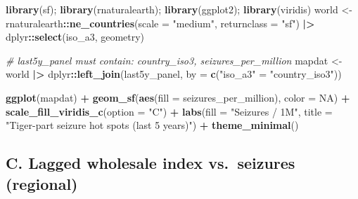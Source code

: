 \documentclass[
]{article}
\newenvironment{Shaded}{\begin{snugshade}}{\end{snugshade}}
\newcommand{\AttributeTok}[1]{\textcolor[rgb]{0.13,0.29,0.53}{#1}}
\newcommand{\CommentTok}[1]{\textcolor[rgb]{0.56,0.35,0.01}{\textit{#1}}}
\newcommand{\ConstantTok}[1]{\textcolor[rgb]{0.56,0.35,0.01}{#1}}
\newcommand{\FunctionTok}[1]{\textcolor[rgb]{0.13,0.29,0.53}{\textbf{#1}}}
\newcommand{\NormalTok}[1]{#1}
\newcommand{\OtherTok}[1]{\textcolor[rgb]{0.56,0.35,0.01}{#1}}
\newcommand{\SpecialCharTok}[1]{\textcolor[rgb]{0.81,0.36,0.00}{\textbf{#1}}}
\newcommand{\StringTok}[1]{\textcolor[rgb]{0.31,0.60,0.02}{#1}}
\begin{document}
\begin{Shaded}
\begin{Highlighting}[]
\FunctionTok{library}\NormalTok{(sf); }\FunctionTok{library}\NormalTok{(rnaturalearth); }\FunctionTok{library}\NormalTok{(ggplot2); }\FunctionTok{library}\NormalTok{(viridis)}
\NormalTok{world }\OtherTok{\textless{}{-}}\NormalTok{ rnaturalearth}\SpecialCharTok{::}\FunctionTok{ne\_countries}\NormalTok{(}\AttributeTok{scale =} \StringTok{"medium"}\NormalTok{, }\AttributeTok{returnclass =} \StringTok{"sf"}\NormalTok{) }\SpecialCharTok{|\textgreater{}}
\NormalTok{  dplyr}\SpecialCharTok{::}\FunctionTok{select}\NormalTok{(iso\_a3, geometry)}

\CommentTok{\# last5y\_panel must contain: country\_iso3, seizures\_per\_million}
\NormalTok{mapdat }\OtherTok{\textless{}{-}}\NormalTok{ world }\SpecialCharTok{|\textgreater{}}\NormalTok{ dplyr}\SpecialCharTok{::}\FunctionTok{left\_join}\NormalTok{(last5y\_panel, }\AttributeTok{by =} \FunctionTok{c}\NormalTok{(}\StringTok{"iso\_a3"} \OtherTok{=} \StringTok{"country\_iso3"}\NormalTok{))}

\FunctionTok{ggplot}\NormalTok{(mapdat) }\SpecialCharTok{+}
  \FunctionTok{geom\_sf}\NormalTok{(}\FunctionTok{aes}\NormalTok{(}\AttributeTok{fill =}\NormalTok{ seizures\_per\_million), }\AttributeTok{color =} \ConstantTok{NA}\NormalTok{) }\SpecialCharTok{+}
  \FunctionTok{scale\_fill\_viridis\_c}\NormalTok{(}\AttributeTok{option =} \StringTok{"C"}\NormalTok{) }\SpecialCharTok{+}
  \FunctionTok{labs}\NormalTok{(}\AttributeTok{fill =} \StringTok{"Seizures / 1M"}\NormalTok{, }\AttributeTok{title =} \StringTok{"Tiger{-}part seizure hot spots (last 5 years)"}\NormalTok{) }\SpecialCharTok{+}
  \FunctionTok{theme\_minimal}\NormalTok{()}
\end{Highlighting}
\end{Shaded}

\subsection{C. Lagged wholesale index vs.~seizures
(regional)}\label{c.-lagged-wholesale-index-vs.-seizures-regional}
\end{document}
